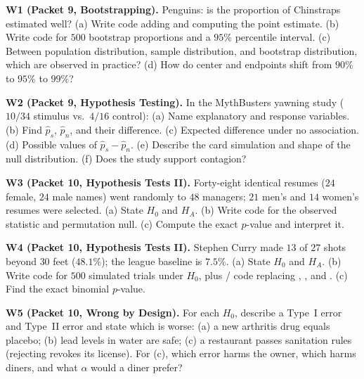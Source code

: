 \documentclass[10pt]{scrartcl}
\begin{document}
\begin{prob}
\textbf{W1 (Packet 9, Bootstrapping).} Penguins: is the proportion of Chinstraps estimated well? (a) Write  code adding  and computing the point estimate. (b) Write  code for $500$ bootstrap proportions and a $95\%$ percentile interval. (c) Between population distribution, sample distribution, and bootstrap distribution, which are observed in practice? (d) How do center and endpoints shift from $90\%$ to $95\%$ to $99\%$?
\end{prob}

\begin{prob}
\textbf{W2 (Packet 9, Hypothesis Testing).} In the MythBusters yawning study ($10/34$ stimulus vs.\ $4/16$ control): (a) Name explanatory and response variables. (b) Find $\hat p_s$, $\hat p_n$, and their difference. (c) Expected difference under no association. (d) Possible values of $\hat p_s - \hat p_n$. (e) Describe the card simulation and shape of the null distribution. (f) Does the study support contagion?
\end{prob}

\begin{prob}
\textbf{W3 (Packet 10, Hypothesis Tests II).} Forty-eight identical resumes ($24$ female, $24$ male names) went randomly to $48$ managers; $21$ men's and $14$ women's resumes were selected. (a) State $H_0$ and $H_A$. (b) Write  code for the observed statistic and permutation null. (c) Compute the exact $p$-value and interpret it.
\end{prob}

\begin{prob}
\textbf{W4 (Packet 10, Hypothesis Tests II).} Stephen Curry made $13$ of $27$ shots beyond $30$ feet ($48.1\%$); the league baseline is $7.5\%$. (a) State $H_0$ and $H_A$. (b) Write  code for $500$ simulated trials under $H_0$, plus / code replacing , , and . (c) Find the exact binomial $p$-value.
\end{prob}

\begin{prob}
\textbf{W5 (Packet 10, Wrong by Design).} For each $H_0$, describe a Type~I error and Type~II error and state which is worse: (a) a new arthritis drug equals placebo; (b) lead levels in water are safe; (c) a restaurant passes sanitation rules (rejecting revokes its license). For (c), which error harms the owner, which harms diners, and what $\alpha$ would a diner prefer?
\end{prob}
\end{document}
